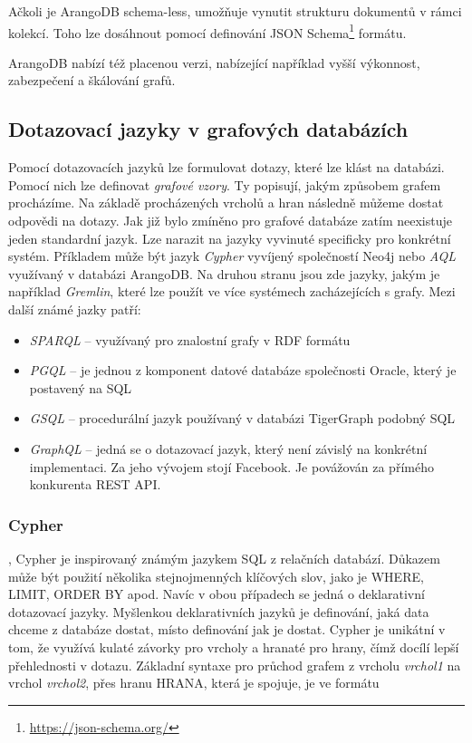 \documentclass[
  program=infoi,
  biblatex=true,
  sourcecodes=true,
  figures=true,
  glossaries=false,
  index
]{kidiplom}
\begin{document}
Ačkoli je ArangoDB schema-less, umožňuje vynutit strukturu dokumentů v rámci kolekcí.  Toho lze dosáhnout pomocí definování JSON Schema\footnote{\url{https://json-schema.org/}} formátu.

ArangoDB nabízí též placenou verzi, nabízející například vyšší výkonnost, zabezpečení a škálování grafů.

\subsection{Dotazovací jazyky v grafových databázích}
Pomocí dotazovacích jazyků lze formulovat dotazy, které lze klást na databázi. Pomocí nich lze definovat \textit{grafové vzory}. Ty popisují, jakým způsobem grafem procházíme. Na základě procházených vrcholů a hran následně můžeme dostat odpovědi na dotazy. Jak již bylo zmíněno pro grafové databáze zatím neexistuje jeden standardní jazyk. Lze narazit na jazyky vyvinuté specificky pro konkrétní systém. Příkladem může být jazyk \textit{Cypher} vyvíjený společností Neo4j nebo \textit{AQL} využívaný v databázi ArangoDB. Na druhou stranu jsou zde jazyky, jakým je například \textit{Gremlin}, které lze použít ve více systémech zacházejících s grafy. Mezi další známé jazky patří:
\begin{itemize}
\item \textit{SPARQL} -- využívaný pro znalostní grafy v RDF formátu
\item \textit{PGQL} -- je jednou z komponent datové databáze společnosti Oracle, který je postavený na SQL
\item \textit{GSQL} -- procedurální jazyk používaný v databázi TigerGraph podobný SQL
\item \textit{GraphQL} -- jedná se o dotazovací jazyk, který není závislý na konkrétní implementaci. Za jeho vývojem stojí Facebook. Je povážován za přímého konkurenta REST API.
\end{itemize}

\subsubsection{Cypher}
\cite{neo4jDoc}, \cite{neo4jDev}
Cypher je inspirovaný známým jazykem SQL z relačních databází. Důkazem může být použití několika stejnojmenných klíčových slov, jako je WHERE, LIMIT, ORDER BY apod. Navíc v obou případech se jedná o deklarativní dotazovací jazyky. Myšlenkou deklarativních jazyků je definování, jaká data chceme z databáze dostat, místo definování jak je dostat. Cypher je unikátní v tom, že využívá kulaté závorky pro vrcholy a hranaté pro hrany, čímž docílí lepší přehlednosti v dotazu. Základní syntaxe pro průchod grafem z vrcholu \textit{vrchol1} na vrchol \textit{vrchol2}, přes hranu HRANA, která je spojuje, je ve formátu 
\end{document}
